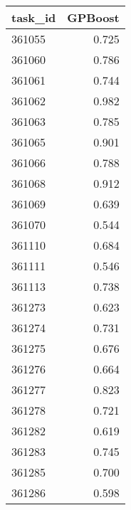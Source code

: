 \begin{tabular}{lr}
\toprule
task\_id & GPBoost \\
\midrule
361055 & 0.725 \\
361060 & 0.786 \\
361061 & 0.744 \\
361062 & 0.982 \\
361063 & 0.785 \\
361065 & 0.901 \\
361066 & 0.788 \\
361068 & 0.912 \\
361069 & 0.639 \\
361070 & 0.544 \\
361110 & 0.684 \\
361111 & 0.546 \\
361113 & 0.738 \\
361273 & 0.623 \\
361274 & 0.731 \\
361275 & 0.676 \\
361276 & 0.664 \\
361277 & 0.823 \\
361278 & 0.721 \\
361282 & 0.619 \\
361283 & 0.745 \\
361285 & 0.700 \\
361286 & 0.598 \\
\bottomrule
\end{tabular}
